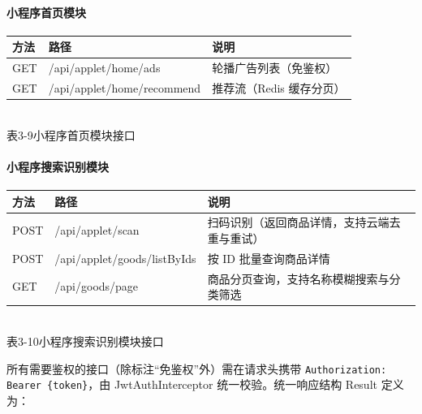 \paragraph{小程序首页模块}

\begin{center}
  \renewcommand{\arraystretch}{1.4}
  \begin{tabular}{|>{\centering\arraybackslash}m{1.5cm}|>{\centering\arraybackslash}m{6.0cm}|>{\centering\arraybackslash}m{5.2cm}|}
    \hline
    \textbf{方法} & \textbf{路径}                & \textbf{说明}     \\ \hline
    GET         & /api/applet/home/ads       & 轮播广告列表（免鉴权）     \\ \hline
    GET         & /api/applet/home/recommend & 推荐流（Redis 缓存分页） \\ \hline
  \end{tabular}
  \\[0.3em]
  {表3-9\quad 小程序首页模块接口}
\end{center}

\paragraph{小程序搜索识别模块}

\begin{center}
  \renewcommand{\arraystretch}{1.4}
  \begin{tabular}{|>{\centering\arraybackslash}m{1.5cm}|>{\centering\arraybackslash}m{6.0cm}|>{\centering\arraybackslash}m{5.2cm}|}
    \hline
    \textbf{方法} & \textbf{路径}                 & \textbf{说明}   \\ \hline
    POST        & /api/applet/scan            & 扫码识别（返回商品详情，支持云端去重与重试）  \\ \hline
    POST        & /api/applet/goods/listByIds & 按 ID 批量查询商品详情 \\ \hline
    GET         & /api/goods/page             & 商品分页查询，支持名称模糊搜索与分类筛选 \\ \hline
  \end{tabular}
  \\[0.3em]
  {表3-10\quad 小程序搜索识别模块接口}
\end{center}

所有需要鉴权的接口（除标注“免鉴权”外）需在请求头携带 \texttt{Authorization: Bearer \{token\}}，由 JwtAuthInterceptor 统一校验。统一响应结构 Result 定义为：

